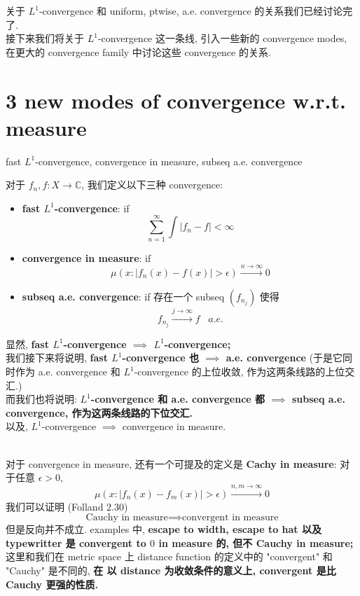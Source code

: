 \documentclass[lang=cn,11pt]{elegantbook}
\begin{document}
关于 $L^1$-convergence 和 uniform, ptwise, a.e. convergence 的关系我们已经讨论完了. \\
接下来我们将关于 $L^1$-convergence 这一条线, 引入一些新的 convergence modes, 在更大的 convergence family 中讨论这些 convergence 的关系. 

\section{3 new modes of convergence w.r.t. measure}
\begin{definition}{fast $L^1$-convergence, convergence in measure, subseq a.e. convergence}

对于  $f_n,f:X \rightarrow \mathbb{C}$, 我们定义以下三种 convergence:
\begin{itemize}
    \item \textbf{fast $L^1$-convergence}: if  \[
    \sum_{n=1}^\infty \int |f_n - f| < \infty    
    \]
    \item \textbf{convergence in measure}: if \[
    \mu(x : |f_n(x) - f(x)| > \epsilon) \overset{n\to \infty}{\longrightarrow} 0
    \]
    \item \textbf{subseq a.e. convergence}: if 存在一个 subseq $(f_{n_j})$ 使得 \[
    f_{n_j} \overset{j\to \infty}{\longrightarrow} f \;\;\; a.e.
    \]
\end{itemize}
\end{definition}
显然, \textbf{fast $L^1$-convergence $\implies $ $L^1$-convergence;}\\
我们接下来将说明, \textbf{fast $L^1$-convergence 也 $\implies$ a.e. convergence} (于是它同时作为 a.e. convergence 和 $L^1$-convergence 的上位收敛, 作为这两条线路的上位交汇.)\\
而我们也将说明:  \textbf{$L^1$-convergence 和 a.e. convergence 都 $\implies$ subseq a.e. convergence, 作为这两条线路的下位交汇.}\\
以及, $L^1$-convergence $\implies$ convergence in measure.\\\\

\begin{remark}
    对于 convergence in measure, 还有一个可提及的定义是 \textbf{Cachy in measure}: 对于任意 $\epsilon>0$,  \[
    \mu(x : |f_n(x) - f_m(x)| > \epsilon) \overset{n,m\to \infty}{\longrightarrow} 0
    \]
    我们可以证明 (Folland 2.30)\[\text{Cauchy in measure} \implies \text{convergent in measure}\]
    但是反向并不成立. examples 中,\textbf{ escape to width, escape to hat 以及 typewritter 是 convergent to $0$ in measure 的, 但不 Cauchy in measure; }\\
    这里和我们在 metric space 上 distance function 的定义中的 "convergent" 和 "Cauchy" 是不同的, \textbf{在 以 distance 为收敛条件的意义上, convergent 是比 Cauchy 更强的性质.} 
\end{remark}
\end{document}
